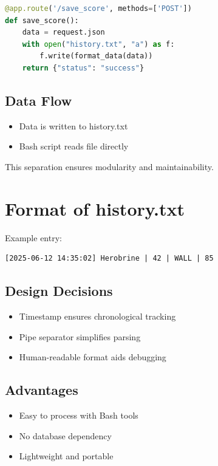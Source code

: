 \documentclass[12pt]{article}
\begin{document}
\begin{lstlisting}[language=Python]
@app.route('/save_score', methods=['POST'])
def save_score():
    data = request.json
    with open("history.txt", "a") as f:
        f.write(format_data(data))
    return {"status": "success"}
\end{lstlisting}

\subsection{Data Flow}
\begin{itemize}
    \item Data is written to history.txt
    \item Bash script reads file directly
\end{itemize}

This separation ensures modularity and maintainability.

\section{Format of history.txt}

Example entry:

\begin{verbatim}
[2025-06-12 14:35:02] Herobrine | 42 | WALL | 85
\end{verbatim}

\subsection{Design Decisions}
\begin{itemize}
    \item Timestamp ensures chronological tracking
    \item Pipe separator simplifies parsing
    \item Human-readable format aids debugging
\end{itemize}

\subsection{Advantages}
\begin{itemize}
    \item Easy to process with Bash tools
    \item No database dependency
    \item Lightweight and portable
\end{itemize}
\end{document}
